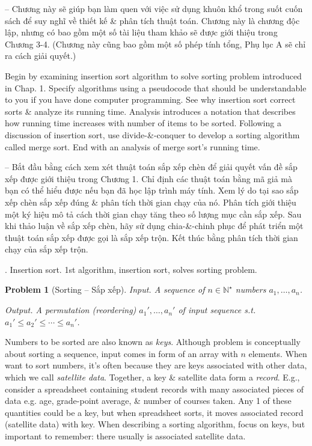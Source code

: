 \documentclass{article}
\newtheorem{problem}{Problem}
\begin{document}
\begin{itemize}
\begin{itemize}
        -- Chương này sẽ giúp bạn làm quen với việc sử dụng khuôn khổ trong suốt cuốn sách để suy nghĩ về thiết kế \& phân tích thuật toán. Chương này là chương độc lập, nhưng có bao gồm một số tài liệu tham khảo sẽ được giới thiệu trong Chương 3-4. (Chương này cũng bao gồm một số phép tính tổng, Phụ lục A sẽ chỉ ra cách giải quyết.)
        
        Begin by examining insertion sort algorithm to solve sorting problem introduced in Chap. 1. Specify algorithms using a pseudocode that should be understandable to you if you have done computer programming. See why insertion sort correct sorts \& analyze its running time. Analysis introduces a notation that describes how running time increases with number of items to be sorted. Following a discussion of insertion sort, use divide-\&-conquer to develop a sorting algorithm called merge sort. End with an analysis of merge sort's running time.
        
        -- Bắt đầu bằng cách xem xét thuật toán sắp xếp chèn để giải quyết vấn đề sắp xếp được giới thiệu trong Chương 1. Chỉ định các thuật toán bằng mã giả mà bạn có thể hiểu được nếu bạn đã học lập trình máy tính. Xem lý do tại sao sắp xếp chèn sắp xếp đúng \& phân tích thời gian chạy của nó. Phân tích giới thiệu một ký hiệu mô tả cách thời gian chạy tăng theo số lượng mục cần sắp xếp. Sau khi thảo luận về sắp xếp chèn, hãy sử dụng chia-\&-chinh phục để phát triển một thuật toán sắp xếp được gọi là sắp xếp trộn. Kết thúc bằng phân tích thời gian chạy của sắp xếp trộn.
        \begin{itemize}
            \item {. Insertion sort.} 1st algorithm, insertion sort, solves sorting problem.
            
            \begin{problem}[Sorting -- Sắp xếp]
                \item {\sf Input.} A sequence of $n\in\mathbb{N}^\star$ numbers $a_1,\ldots,a_n$.
                \item {\sf Output.} A permutation (reordering) $a_1',\ldots,a_n'$ of input sequence s.t. $a_1'\le a_2'\le\cdots\le a_n'$.
            \end{problem}
            Numbers to be sorted are also known as {\it keys}. Although problem is conceptually about sorting a sequence, input comes in form of an array with $n$ elements. When want to sort numbers, it's often because they are keys associated with other data, which we call {\it satellite data}. Together, a key \& satellite data form a {\it record}. E.g., consider a spreadsheet containing student records with many associated pieces of data e.g. age, grade-point average, \& number of courses taken. Any 1 of these quantities could be a key, but when spreadsheet sorts, it moves associated record (satellite data) with key. When describing a sorting algorithm, focus on keys, but important to remember: there usually is associated satellite data.
            

\end{itemize}
\end{itemize}
\end{itemize}
\end{document}
